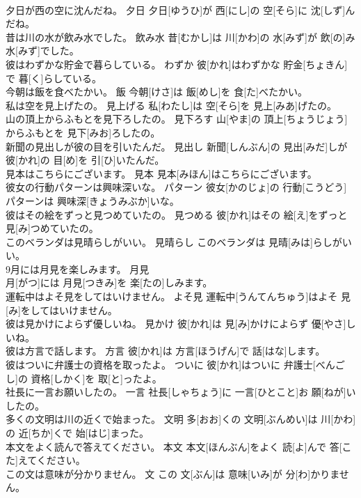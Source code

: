 \documentclass[8pt]{extreport}
\begin{document}
\begin{CJK}{UTF8}{min}
\\	夕日が西の空に沈んだね。	夕日	夕日[ゆうひ]が 西[にし]の 空[そら]に 沈[しず]んだね。	
\\	昔は川の水が飲み水でした。	飲み水	昔[むかし]は 川[かわ]の 水[みず]が 飲[の]み 水[みず]でした。	
\\	彼はわずかな貯金で暮らしている。	わずか	彼[かれ]はわずかな 貯金[ちょきん]で 暮[く]らしている。	
\\	今朝は飯を食べたかい。	飯	今朝[けさ]は 飯[めし]を 食[た]べたかい。	
\\	私は空を見上げたの。	見上げる	私[わたし]は 空[そら]を 見上[みあ]げたの。	
\\	山の頂上からふもとを見下ろしたの。	見下ろす	山[やま]の 頂上[ちょうじょう]からふもとを 見下[みお]ろしたの。	
\\	新聞の見出しが彼の目を引いたんだ。	見出し	新聞[しんぶん]の 見出[みだ]しが 彼[かれ]の 目[め]を 引[ひ]いたんだ。	
\\	見本はこちらにございます。	見本	見本[みほん]はこちらにございます。	
\\	彼女の行動パターンは興味深いな。	パターン	彼女[かのじょ]の 行動[こうどう]パターンは 興味深[きょうみぶか]いな。	
\\	彼はその絵をずっと見つめていたの。	見つめる	彼[かれ]はその 絵[え]をずっと 見[み]つめていたの。	
\\	このベランダは見晴らしがいい。	見晴らし	このベランダは 見晴[みは]らしがいい。	
\\	9月には月見を楽しみます。	月見	
\\	月[がつ]には 月見[つきみ]を 楽[たの]しみます。	
\\	運転中はよそ見をしてはいけません。	よそ見	運転中[うんてんちゅう]はよそ 見[み]をしてはいけません。	
\\	彼は見かけによらず優しいね。	見かけ	彼[かれ]は 見[み]かけによらず 優[やさ]しいね。	
\\	彼は方言で話します。	方言	彼[かれ]は 方言[ほうげん]で 話[はな]します。	
\\	彼はついに弁護士の資格を取ったよ。	ついに	彼[かれ]はついに 弁護士[べんごし]の 資格[しかく]を 取[と]ったよ。	
\\	社長に一言お願いしたの。	一言	社長[しゃちょう]に 一言[ひとこと]お 願[ねが]いしたの。	
\\	多くの文明は川の近くで始まった。	文明	多[おお]くの 文明[ぶんめい]は 川[かわ]の 近[ちか]くで 始[はじ]まった。	
\\	本文をよく読んで答えてください。	本文	本文[ほんぶん]をよく 読[よ]んで 答[こた]えてください。	
\\	この文は意味が分かりません。	文	この 文[ぶん]は 意味[いみ]が 分[わ]かりません。	

\end{CJK}
\end{document}
